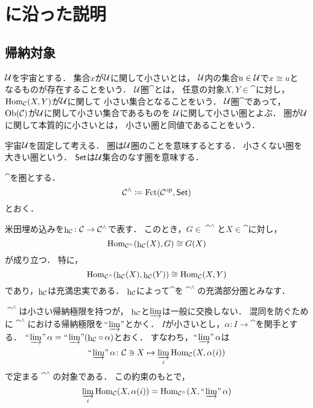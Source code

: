\clearpage
\setcounter{section}{0}
\appendix
\section{\cite{KS01}に沿った説明}
\setcounter{subsection}{0}
\setcounter{Axiom}{0}

\subsection{帰納対象}

$\U$を宇宙とする．
集合$x$が$\U$に関して小さいとは，
$\U$内の集合$u\in\U$で$x\cong u$と
なるものが存在することをいう．
$\U$圏$\cat$とは，
任意の対象$X,Y\in\cat$に対し，$\Hom_\cat(X,Y)$が$\U$に関して
小さい集合となることをいう．
$\U$圏$\cat$であって，
$\Ob(\cat)$が$\U$に関して小さい集合であるものを
$\U$に関して小さい圏とよぶ．
圏が$\U$に関して本質的に小さいとは，
小さい圏と同値であることをいう．

宇宙$\U$を固定して考える．
圏は$\U$圏のことを意味するとする．
小さくない圏を大きい圏という．
$\Set$は$\U$集合のなす圏を意味する．

\begin{Definition}
    $\cat$を圏とする．
    \begin{equation*}
        \cat^\wedge\coloneqq\Fct(\cat^\op,\Set)
    \end{equation*}
    とおく．
\end{Definition}

米田埋め込みを$\hh_\cat\colon\cat\to\cat^\wedge$で表す．
このとき，$G\in\cat^\wedge$と$X\in\cat$に対し，
\begin{equation}
    \Hom_{\cat^\wedge}(\hh_\cat(X),G)\cong G(X)
\end{equation}
が成り立つ．
特に，
\begin{equation*}
    \Hom_{\cat^\wedge}(\hh_\cat(X),\hh_\cat(Y))
    \cong 
    \Hom_\cat(X,Y)
\end{equation*}
であり，$\hh_\cat$は充満忠実である．
$\hh_\cat$によって$\cat$を$\cat^\wedge$の充満部分圏とみなす．

$\cat^\wedge$は小さい帰納極限を持つが，
$\hh_\cat$と$\varinjlim$は一般に交換しない．
混同を防ぐために$\cat^\wedge$における帰納極限を$\limf$とかく．
$I$が小さいとし，$\alpha\colon I\to\cat$を関手とする．
$\limf\alpha=\limf({\hh}_\cat\circ\alpha)$とおく．
すなわち，$\limf\alpha$は
\begin{equation*}
    \limf\alpha\colon\cat\ni X\mapsto\varinjlim_i\Hom_\cat(X,\alpha(i))
\end{equation*}
で定まる$\cat^\wedge$の対象である．
この約束のもとで，
\begin{equation*}
    \varinjlim_i\Hom_\cat(X,\alpha(i))
    =\Hom_{\cat^\wedge}(X,\limf\alpha)
\end{equation*}

